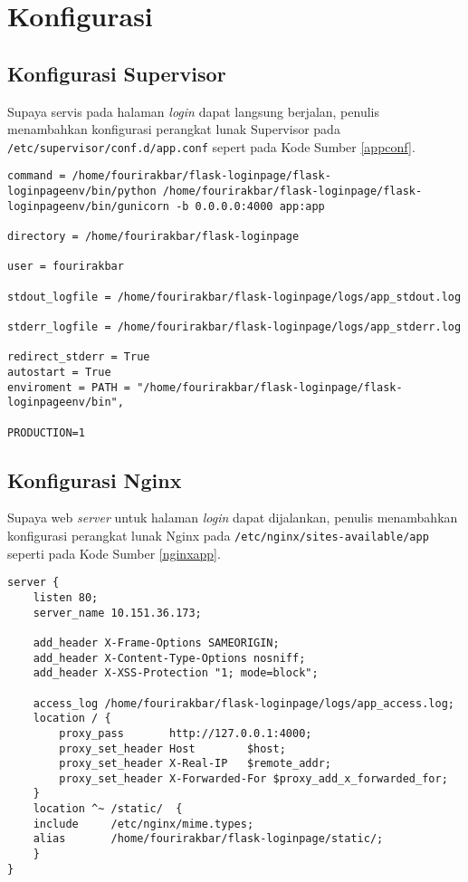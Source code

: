 \chapter{Konfigurasi}

\section*{Konfigurasi Supervisor}

Supaya servis pada halaman \textit{login} dapat langsung berjalan, penulis menambahkan konfigurasi perangkat lunak Supervisor pada \texttt{/etc/supervisor/conf.d/app.conf} sepert pada Kode Sumber \ref{appconf}. 

\begin{lstlisting}[frame=single,tabsize=2,breaklines,caption={Isi Berkas app.conf},label=appconf, captionpos=b]
command = /home/fourirakbar/flask-loginpage/flask-loginpageenv/bin/python /home/fourirakbar/flask-loginpage/flask-loginpageenv/bin/gunicorn -b 0.0.0.0:4000 app:app

directory = /home/fourirakbar/flask-loginpage

user = fourirakbar

stdout_logfile = /home/fourirakbar/flask-loginpage/logs/app_stdout.log

stderr_logfile = /home/fourirakbar/flask-loginpage/logs/app_stderr.log

redirect_stderr = True
autostart = True
enviroment = PATH = "/home/fourirakbar/flask-loginpage/flask-loginpageenv/bin", 

PRODUCTION=1
\end{lstlisting}

\section*{Konfigurasi Nginx}

Supaya web \textit{server} untuk halaman \textit{login} dapat dijalankan, penulis menambahkan konfigurasi perangkat lunak Nginx pada \texttt{/etc/nginx/sites-available/app} seperti pada Kode Sumber \ref{nginxapp}.

\begin{lstlisting}[frame=single,tabsize=2,breaklines,caption={Isi Berkas app},label=nginxapp, captionpos=b]
server {
	listen 80;
	server_name 10.151.36.173;
	
	add_header X-Frame-Options SAMEORIGIN;
	add_header X-Content-Type-Options nosniff;
	add_header X-XSS-Protection "1; mode=block";
	
	access_log /home/fourirakbar/flask-loginpage/logs/app_access.log;
	location / {
		proxy_pass       http://127.0.0.1:4000;
		proxy_set_header Host        $host;
		proxy_set_header X-Real-IP   $remote_addr;
		proxy_set_header X-Forwarded-For $proxy_add_x_forwarded_for;
	}
	location ^~ /static/  {
	include     /etc/nginx/mime.types;
	alias       /home/fourirakbar/flask-loginpage/static/;
	}  
}
\end{lstlisting}